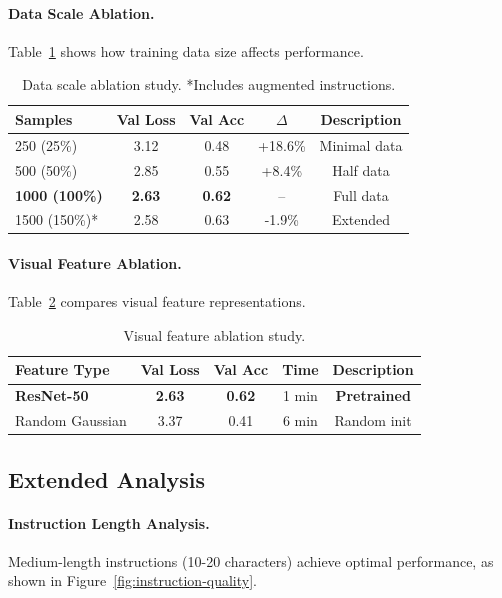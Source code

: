 \documentclass[11pt,a4paper]{article}
\begin{document}
\paragraph{Data Scale Ablation.}
Table~\ref{tab:data-ablation} shows how training data size affects performance.

\begin{table}[t]
\centering
\small
\begin{tabular}{lcccc}
\toprule
\textbf{Samples} & \textbf{Val Loss} & \textbf{Val Acc} & \textbf{$\Delta$} & \textbf{Description} \\
\midrule
250 (25\%) & 3.12 & 0.48 & +18.6\% & Minimal data \\
500 (50\%) & 2.85 & 0.55 & +8.4\% & Half data \\
\textbf{1000 (100\%)} & \textbf{2.63} & \textbf{0.62} & -- & Full data \\
1500 (150\%)* & 2.58 & 0.63 & -1.9\% & Extended \\
\bottomrule
\end{tabular}
\caption{Data scale ablation study. *Includes augmented instructions.}
\label{tab:data-ablation}
\end{table}

\paragraph{Visual Feature Ablation.}
Table~\ref{tab:feature-ablation} compares visual feature representations.

\begin{table}[t]
\centering
\small
\begin{tabular}{lcccc}
\toprule
\textbf{Feature Type} & \textbf{Val Loss} & \textbf{Val Acc} & \textbf{Time} & \textbf{Description} \\
\midrule
\textbf{ResNet-50} & \textbf{2.63} & \textbf{0.62} & 1 min & \textbf{Pretrained} \\
Random Gaussian & 3.37 & 0.41 & 6 min & Random init \\
\bottomrule
\end{tabular}
\caption{Visual feature ablation study.}
\label{tab:feature-ablation}
\end{table}

\subsection{Extended Analysis}

\paragraph{Instruction Length Analysis.}
Medium-length instructions (10-20 characters) achieve optimal performance, as shown in Figure~\ref{fig:instruction-quality}.
\end{document}
